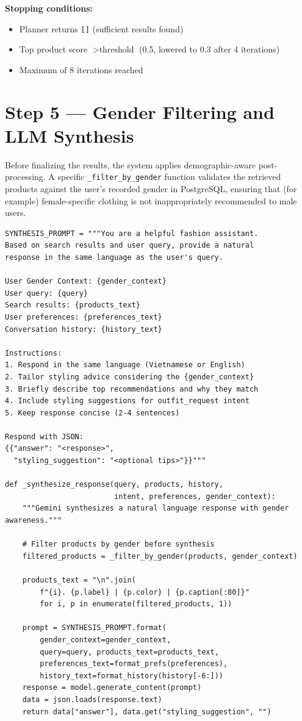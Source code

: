 \documentclass[12pt, twoside]{report}
\begin{document}
\textbf{Stopping conditions:}
\begin{itemize}
    \item Planner returns \texttt{[]} (sufficient results found)
    \item Top product score $> \text{threshold}$ (0.5, lowered to 0.3 after 4 iterations)
    \item Maximum of 8 iterations reached
\end{itemize}

\section{Step 5 --- Gender Filtering and LLM Synthesis}

Before finalizing the results, the system applies demographic-aware post-processing. A specific \texttt{\_filter\_by\_gender} function validates the retrieved products against the user's recorded gender in PostgreSQL, ensuring that (for example) female-specific clothing is not inappropriately recommended to male users.

\begin{lstlisting}[caption={Gender Filtering and LLM Synthesis --- agent/fashion\_agent.py}]
SYNTHESIS_PROMPT = """You are a helpful fashion assistant.
Based on search results and user query, provide a natural
response in the same language as the user's query.

User Gender Context: {gender_context}
User query: {query}
Search results: {products_text}
User preferences: {preferences_text}
Conversation history: {history_text}

Instructions:
1. Respond in the same language (Vietnamese or English)
2. Tailor styling advice considering the {gender_context}
3. Briefly describe top recommendations and why they match
4. Include styling suggestions for outfit_request intent
5. Keep response concise (2-4 sentences)

Respond with JSON:
{{"answer": "<response>",
  "styling_suggestion": "<optional tips>"}}"""

def _synthesize_response(query, products, history,
                         intent, preferences, gender_context):
    """Gemini synthesizes a natural language response with gender awareness."""
    
    # Filter products by gender before synthesis
    filtered_products = _filter_by_gender(products, gender_context)
    
    products_text = "\n".join(
        f"{i}. {p.label} | {p.color} | {p.caption[:80]}"
        for i, p in enumerate(filtered_products, 1))
        
    prompt = SYNTHESIS_PROMPT.format(
        gender_context=gender_context,
        query=query, products_text=products_text,
        preferences_text=format_prefs(preferences),
        history_text=format_history(history[-6:]))
    response = model.generate_content(prompt)
    data = json.loads(response.text)
    return data["answer"], data.get("styling_suggestion", "")
\end{lstlisting}
\end{document}
